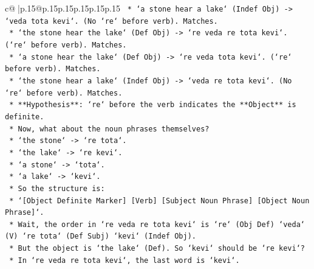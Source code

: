 \documentclass{article}
\begin{document}
{\begin{supertabular}{c@{$\;$}|p{.15\linewidth}@{}p{.15\linewidth}p{.15\linewidth}p{.15\linewidth}p{.15\linewidth}p{.15\linewidth}}
{{{\texttt{                                                        *   `a stone hear a lake` (Indef Obj) {-}> `veda tota kevi`. (No `re` before verb). Matches.} \\
\texttt{                                                        *   `the stone hear the lake` (Def Obj) {-}> `re veda re tota kevi`. (`re` before verb). Matches.} \\
\texttt{                                                        *   `a stone hear the lake` (Def Obj) {-}> `re veda tota kevi`. (`re` before verb). Matches.} \\
\texttt{                                                        *   `the stone hear a lake` (Indef Obj) {-}> `veda re tota kevi`. (No `re` before verb). Matches.} \\
\texttt{                                                    *   **Hypothesis**: `re` before the verb indicates the **Object** is definite.} \\
\texttt{                                                    *   Now, what about the noun phrases themselves?} \\
\texttt{                                                        *   `the stone` {-}> `re tota`.} \\
\texttt{                                                        *   `the lake` {-}> `re kevi`.} \\
\texttt{                                                        *   `a stone` {-}> `tota`.} \\
\texttt{                                                        *   `a lake` {-}> `kevi`.} \\
\texttt{                                                    *   So the structure is:} \\
\texttt{                                                        *   `{[}Object Definite Marker{]} {[}Verb{]} {[}Subject Noun Phrase{]} {[}Object Noun Phrase{]}`.} \\
\texttt{                                                        *   Wait, the order in `re veda re tota kevi` is `re` (Obj Def) `veda` (V) `re tota` (Def Subj) `kevi` (Indef Obj).} \\
\texttt{                                                        *   But the object is `the lake` (Def). So `kevi` should be `re kevi`?} \\
\texttt{                                                        *   In `re veda re tota kevi`, the last word is `kevi`.} \\
}}}
\end{supertabular}}
\end{document}
